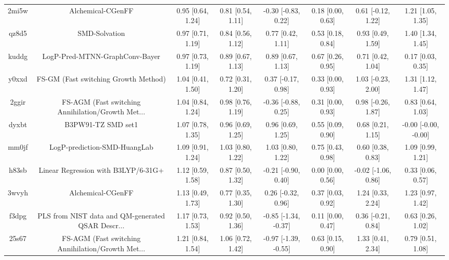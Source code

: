 \documentclass{article}
\begin{document}
\begin{center}
\begin{longtable}{|cccccccc|}
 2mi5w &                                  Alchemical-CGenFF &  0.95 [0.64, 1.24] &  0.81 [0.54, 1.11] &   -0.30 [-0.83, 0.22] &  0.18 [0.00, 0.63] &   0.61 [-0.12, 1.22] &     1.21 [1.05, 1.35] \\
 qz8d5 &                                      SMD-Solvation &  0.97 [0.71, 1.19] &  0.84 [0.56, 1.12] &     0.77 [0.42, 1.11] &  0.53 [0.18, 0.84] &    0.93 [0.49, 1.59] &     1.40 [1.34, 1.45] \\
 kuddg &                     LogP-Pred-MTNN-GraphConv-Bayer &  0.97 [0.73, 1.19] &  0.89 [0.67, 1.13] &     0.89 [0.67, 1.13] &  0.67 [0.26, 0.95] &    0.71 [0.42, 1.04] &     0.17 [0.03, 0.35] \\
 y0xxd &               FS-GM (Fast switching Growth Method) &  1.04 [0.41, 1.50] &  0.72 [0.31, 1.20] &    0.37 [-0.17, 0.98] &  0.33 [0.00, 0.93] &   1.03 [-0.23, 2.00] &     1.31 [1.12, 1.47] \\
 2ggir &  FS-AGM (Fast switching Annihilation/Growth Met... &  1.04 [0.84, 1.24] &  0.98 [0.76, 1.19] &   -0.36 [-0.88, 0.25] &  0.31 [0.00, 0.93] &   0.98 [-0.26, 1.87] &     0.83 [0.64, 1.03] \\
 dyxbt &                                 B3PW91-TZ SMD set1 &  1.07 [0.78, 1.35] &  0.96 [0.69, 1.25] &     0.96 [0.69, 1.25] &  0.55 [0.09, 0.90] &    0.68 [0.21, 1.15] &  -0.00 [-0.00, -0.00] \\
 mm0jf &                       LogP-prediction-SMD-HuangLab &  1.09 [0.91, 1.24] &  1.03 [0.80, 1.22] &     1.03 [0.80, 1.22] &  0.75 [0.43, 0.98] &    0.60 [0.38, 0.83] &     1.09 [0.99, 1.21] \\
 h83sb &                Linear Regression with B3LYP/6-31G+ &  1.12 [0.59, 1.58] &  0.87 [0.50, 1.32] &   -0.21 [-0.90, 0.40] &  0.00 [0.00, 0.56] &  -0.02 [-1.06, 0.86] &     0.33 [0.06, 0.57] \\
 3wvyh &                                  Alchemical-CGenFF &  1.13 [0.49, 1.73] &  0.77 [0.35, 1.30] &    0.26 [-0.32, 0.96] &  0.37 [0.03, 0.92] &    1.24 [0.33, 2.24] &     1.23 [0.97, 1.42] \\
 f3dpg &  PLS from NIST data and QM-generated QSAR Descr... &  1.17 [0.73, 1.53] &  0.92 [0.50, 1.36] &  -0.85 [-1.34, -0.37] &  0.11 [0.00, 0.47] &   0.36 [-0.21, 0.84] &     0.63 [0.26, 1.02] \\
 25s67 &  FS-AGM (Fast switching Annihilation/Growth Met... &  1.21 [0.84, 1.54] &  1.06 [0.72, 1.42] &  -0.97 [-1.39, -0.55] &  0.63 [0.15, 0.90] &    1.33 [0.41, 2.34] &     0.79 [0.51, 1.08] \\

\end{longtable}
\end{center}
\end{document}
